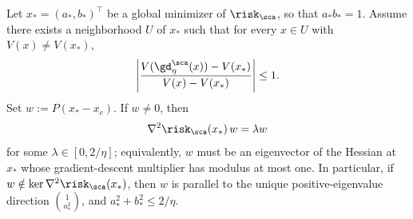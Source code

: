 \documentclass{article}
\begin{document}
\begin{proposition}\label{prop:fixed_quadratic_alignment}
Let $x_* = (a_*, b_*)^\top$ be a global minimizer of $\risk_\sca$, so that
$a_* b_* = 1$. Assume there exists a neighborhood $U$ of $x_*$ such that for every
$x \in U$ with $V(x) \neq V(x_*)$,
\begin{align}
    \left|
    \frac{V(\gd_\eta^\sca(x)) - V(x_*)}{V(x) - V(x_*)}
    \right| \le 1.
\end{align}
Set $w := P(x_* - x_c)$. If $w \neq 0$, then
\begin{align}
    \nabla^2 \risk_\sca(x_*)\, w = \lambda w
\end{align}
for some $\lambda \in[0,2/\eta]$; equivalently, $w$ must be an eigenvector of
the Hessian at $x_*$ whose gradient-descent multiplier has modulus at most one.
In particular, if $w \notin \ker \nabla^2 \risk_\sca(x_*)$, then $w$ is
parallel to the unique positive-eigenvalue direction $\binom{1}{a_*^2}$, and
$a_*^2+b_*^2\le 2/\eta$.
\end{proposition}
\end{document}
